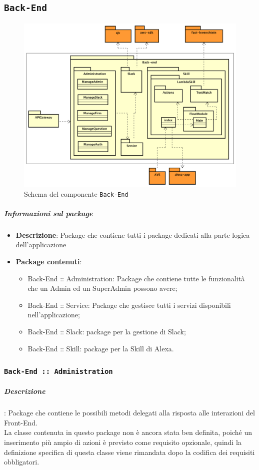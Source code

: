 \documentclass[../DefinizioneDiProdotto_v2.0.0.tex]{subfiles}
\begin{document}
\subsection{\texttt{Back-End}}
\begin{figure}[!h]
	\centering
	\includegraphics[width=\textwidth]{Architettura/Back-end.png}
	\caption{Schema del componente \texttt{Back-End}}
\end{figure}
\subparagraph{Informazioni sul package}
\begin{itemize}
	\item \textbf{Descrizione}: Package che contiene tutti i package dedicati alla parte logica dell'applicazione\item \textbf{Package contenuti}:
	      \begin{itemize}
	      	\item Back-End :: Administration: Package che contiene tutte le funzionalità che un Admin ed un SuperAdmin possono avere;
	      	\item Back-End :: Service: Package che gestisce tutti i servizi disponibili nell'applicazione;
	      	\item Back-End :: Slack: package per la gestione di Slack;
	      	\item Back-End :: Skill: package per la Skill di Alexa.
	      \end{itemize}
\end{itemize}
\subsubsection{\texttt{Back-End :: Administration}}
\subparagraph{Descrizione}: Package che contiene le possibili metodi delegati alla risposta alle interazioni del Front-End.\\
La classe contenuta in questo package non è ancora stata ben definita, poiché un inserimento più ampio di azioni è previsto come requisito opzionale, quindi la definizione specifica di questa classe viene rimandata dopo la codifica dei requisiti obbligatori.
\end{document}
